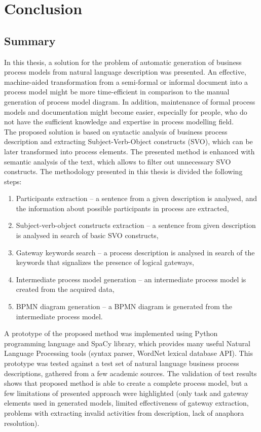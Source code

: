 \chapter{Conclusion}
\label{cha:conclusion}
\section{Summary}
In this thesis, a solution for the problem of automatic generation of business process models from natural language description was presented. An effective, machine-aided transformation from a semi-formal or informal document into a process model might be more time-efficient in comparison to the manual generation of process model diagram. In addition, maintenance of formal process models and documentation might become easier, especially for people, who do not have the sufficient knowledge and expertise in process modelling field.\\
The proposed solution is based on syntactic analysis of business process description and extracting Subject-Verb-Object constructs (SVO), which can be later transformed into process elements. The presented method is enhanced with semantic analysis of the text, which allows to filter out unnecessary SVO constructs. The methodology presented in this thesis is divided the following steps:
\begin{enumerate}
	\item Participants extraction -- a sentence from a given description is analysed, and the information about possible participants in process are extracted,
	\item Subject-verb-object constructs extraction -- a sentence from given description is analysed in search of basic SVO constructs,
	\item Gateway keywords search -- a process description is analysed in search of the keywords that signalizes the presence of logical gateways,
	\item Intermediate process model generation -- an intermediate process model is created from the acquired data,
	\item BPMN diagram generation -- a BPMN diagram is generated from the intermediate process model.
\end{enumerate}
A prototype of the proposed method was implemented using Python programming language and SpaCy library, which provides many useful Natural Language Processing tools (syntax parser, WordNet lexical database API). This prototype was tested against a test set of natural language business process descriptions, gathered from a few academic sources. The validation of test results shows that proposed method is able to create a complete process model, but a few limitations of presented approach were highlighted (only task and gateway elements used in generated models, limited effectiveness of gateway extraction, problems with extracting invalid activities from description, lack of anaphora resolution).

